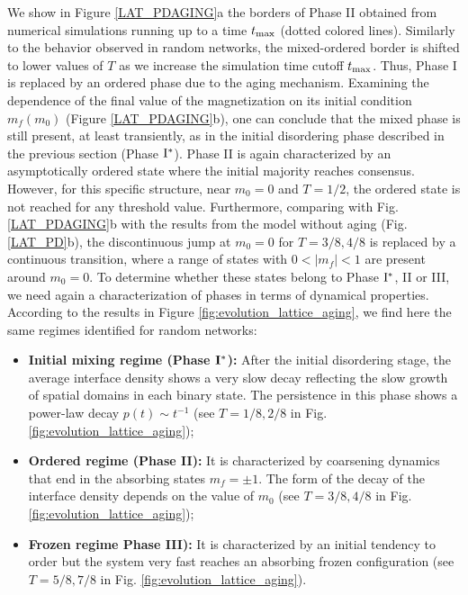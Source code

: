 	We show in Figure \ref{LAT_PDAGING}a the borders of Phase II obtained from numerical simulations running up to a time $t_{\rm max}$ (dotted colored lines). Similarly to the behavior observed in random networks, the mixed-ordered border is shifted to lower values of $T$ as we increase the simulation time cutoff $t_{\rm max}$. Thus, Phase I is replaced by an ordered phase due to the aging mechanism. Examining the dependence of the final value of the magnetization on its initial condition  $m_f(m_0)$  (Figure \ref{LAT_PDAGING}b), one can conclude that the mixed phase is still present, at least transiently, as in the initial disordering phase described in the previous section (Phase ${\rm I}^{*}$). Phase II is again characterized by an asymptotically ordered state where the initial majority reaches consensus. However, for this specific structure, near $m_0 = 0$ and $T = 1/2$, the ordered state is not reached for any threshold value. Furthermore, comparing with Fig. \ref{LAT_PDAGING}b with the results from the model without aging (Fig. \ref{LAT_PD}b), the discontinuous jump at $m_0 = 0$ for $T = 3/8, 4/8$ is replaced by a continuous transition, where a range of states with $0 < |m_f| < 1$ are present around $m_0 = 0$. To determine whether these states belong to Phase ${\rm I}^{*}$, II or III, we need again a characterization of phases in terms of dynamical properties. According to the results in Figure \ref{fig:evolution_lattice_aging}, we find here the same regimes identified for random networks:
	\begin{itemize}
		\item \textbf{Initial mixing regime (Phase ${\rm {\bf I}}^{*}$):}  After the initial disordering stage, the average interface density shows a very slow decay reflecting the slow growth of spatial domains in each binary state. The persistence in this phase shows a power-law decay $p(t) \sim t^{-1}$ (see $T = 1/8,2/8$ in Fig. \ref{fig:evolution_lattice_aging});
		\item \textbf{Ordered regime (Phase II):} It is characterized by coarsening dynamics that end in the absorbing states $m_f = \pm 1$. The form of the decay of the interface density depends on the value of $m_0$ (see $T = 3/8,4/8$ in Fig. \ref{fig:evolution_lattice_aging});
		\item \textbf{Frozen regime Phase III):} It is characterized by an initial tendency to order but the system very fast reaches an absorbing frozen configuration (see $T = 5/8,7/8$ in Fig. \ref{fig:evolution_lattice_aging}).
	\end{itemize}
	
